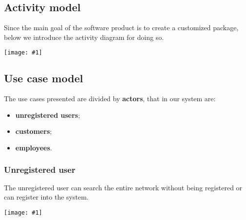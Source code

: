 \documentclass[a4paper,12pt]{book}
\newcommand{\putimg}[2]{
  \begin{center}
    \texttt{[image: \#1]}
  \end{center}
}
\begin{document}
\subsection{Activity model}
Since the main goal of the software product is to create a customized package, below we introduce the activity diagram for doing so.
\putimg{activity-model}{0.3}

\subsection{Use case model}
The use cases presented are divided by \textbf{actors}, that in our system are:
\begin{itemize}[noitemsep]
  \item \textbf{unregistered users};
  \item \textbf{customers};
  \item \textbf{employees}.
\end{itemize}

\subsubsection{Unregistered user}
The unregistered user can search the entire network without being registered or can register into the system.
\putimg{uc-unregistered}{0.4}
\end{document}
